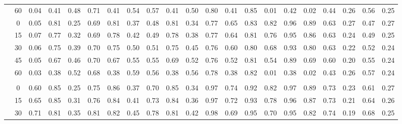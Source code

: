 \begin{table}[h!]
{\begin{tabular}[t]{ccccccccccccccccccccc}
			\hspace{1em}\multirow{-5}{*}{\centering\arraybackslash 0.20} & 60 & 0.04 & 0.41 & 0.48 & 0.71 & 0.41 & 0.54 & 0.57 & 0.41 & 0.50 & 0.80 & 0.41 & 0.85 & 0.01 & 0.42 & 0.02 & 0.44 & 0.26 & 0.56 & 0.25\\
			\cmidrule{1-21}
			& 0 & 0.05 & 0.81 & 0.25 & 0.69 & 0.81 & 0.37 & 0.48 & 0.81 & 0.34 & 0.77 & 0.65 & 0.83 & 0.82 & 0.96 & 0.89 & 0.63 & 0.27 & 0.47 & 0.27\\
			
			\hspace{1em} & 15 & 0.07 & 0.77 & 0.32 & 0.69 & 0.78 & 0.42 & 0.49 & 0.78 & 0.38 & 0.77 & 0.64 & 0.81 & 0.76 & 0.95 & 0.86 & 0.63 & 0.24 & 0.49 & 0.25\\
			
			\hspace{1em} & 30 & 0.06 & 0.75 & 0.39 & 0.70 & 0.75 & 0.50 & 0.51 & 0.75 & 0.45 & 0.76 & 0.60 & 0.80 & 0.68 & 0.93 & 0.80 & 0.63 & 0.22 & 0.52 & 0.24\\
			
			\hspace{1em} & 45 & 0.05 & 0.67 & 0.46 & 0.70 & 0.67 & 0.55 & 0.55 & 0.69 & 0.52 & 0.76 & 0.52 & 0.81 & 0.54 & 0.89 & 0.69 & 0.60 & 0.20 & 0.55 & 0.24\\
			
			\hspace{1em}\multirow{-5}{*}{\centering\arraybackslash 0.33} & 60 & 0.03 & 0.38 & 0.52 & 0.68 & 0.38 & 0.59 & 0.56 & 0.38 & 0.56 & 0.78 & 0.38 & 0.82 & 0.01 & 0.38 & 0.02 & 0.43 & 0.26 & 0.57 & 0.24\\
			\cmidrule{1-21}
			\addlinespace[0.3em]
			\multicolumn{21}{l}{\textbf{Selection probabilities for good dose-levels}}\\
			\hspace{1em}\hspace{1em} & 0 & 0.60 & 0.85 & 0.25 & 0.75 & 0.86 & 0.37 & 0.70 & 0.85 & 0.34 & 0.97 & 0.74 & 0.92 & 0.82 & 0.97 & 0.89 & 0.73 & 0.23 & 0.61 & 0.27\\
			
			\hspace{1em} & 15 & 0.65 & 0.85 & 0.31 & 0.76 & 0.84 & 0.41 & 0.73 & 0.84 & 0.36 & 0.97 & 0.72 & 0.93 & 0.78 & 0.96 & 0.87 & 0.73 & 0.21 & 0.64 & 0.26\\
			
			\hspace{1em} & 30 & 0.71 & 0.81 & 0.35 & 0.81 & 0.82 & 0.45 & 0.78 & 0.81 & 0.42 & 0.98 & 0.69 & 0.95 & 0.70 & 0.95 & 0.82 & 0.74 & 0.19 & 0.68 & 0.25\\
			

\end{tabular}}
\end{table}
